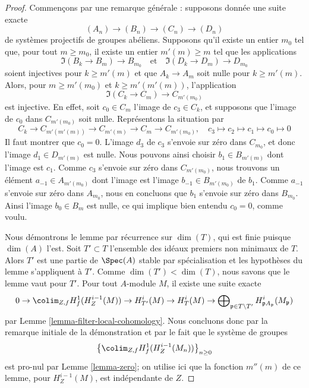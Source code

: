 \begin{proof}
Commençons par une remarque générale : supposons donnée une suite
exacte
$$
(A_n) \to (B_n) \to (C_n) \to (D_n)
$$
de systèmes projectifs de groupes abéliens. Supposons qu'il existe
un entier $m_0$ tel que, pour tout $m \geq m_0$,
il existe un entier $m'(m) \geq m$ tel que les applications
$$
\Im(B_k \to B_m) \longrightarrow B_{m_0}
\quad\text{et}\quad
\Im(D_k \to D_m) \longrightarrow D_{m_0}
$$
soient injectives pour $k \geq m'(m)$ et que $A_k \to A_m$ soit nulle
pour $k \geq m'(m)$. Alors, pour $m \geq m'(m_0)$ et $k \geq m'(m'(m))$,
l'application
$$
\Im(C_k \to C_m) \to C_{m'(m_0)}
$$
est injective. En effet, soit $c_0 \in C_m$ l'image de $c_3 \in C_k$,
et supposons que l'image de $c_0$ dans $C_{m'(m_0)}$ soit nulle. Représentons la situation par
$$
C_k \to C_{m'(m'(m))} \to C_{m'(m)} \to C_m \to C_{m'(m_0)},\quad
c_3 \mapsto c_2 \mapsto c_1 \mapsto c_0 \mapsto 0
$$
Il faut montrer que $c_0 = 0$.
L'image $d_3$ de $c_3$ s'envoie sur zéro dans $C_{m_0}$, et donc
l'image $d_1 \in D_{m'(m)}$ est nulle.
Nous pouvons ainsi choisir $b_1 \in B_{m'(m)}$ dont l'image est
$c_1$. Comme $c_3$ s'envoie sur zéro dans
$C_{m'(m_0)}$, nous trouvons un élément $a_{-1} \in A_{m'(m_0)}$
dont l'image est l'image $b_{-1} \in B_{m'(m_0)}$ de $b_1$.
Comme $a_{-1}$ s'envoie sur zéro dans $A_{m_0}$, nous en concluons que
$b_1$ s'envoie sur zéro dans $B_{m_0}$. Ainsi l'image $b_0 \in B_m$
est nulle, ce qui implique bien entendu $c_0 = 0$, comme voulu.

\medskip\noindent
Nous démontrons le lemme par récurrence sur $\dim(T)$, qui est
finie puisque $\dim(A)$ l'est. Soit $T' \subset T$
l'ensemble des idéaux premiers non minimaux de $T$. Alors $T'$ est une partie
de $\Spec(A)$ stable par spécialisation et les hypothèses
du lemme s'appliquent à $T'$. Comme $\dim(T') < \dim(T)$, nous savons
que le lemme vaut pour $T'$. Pour tout $A$-module $M$, il existe une
suite exacte
$$
0 \to \colim_{Z, f} H^1_f(H^{i - 1}_Z(M)) \to
H^i_{T'}(M) \to H^i_T(M) \to
\bigoplus\nolimits_{\mathfrak p \in T \setminus T'}
H^i_{\mathfrak p A_\mathfrak p}(M_\mathfrak p)
$$
par Lemme \ref{lemma-filter-local-cohomology}.
Nous concluons donc par la remarque initiale de la démonstration
et par le fait que le système de groupes
$$
\left\{\colim_{Z, f} H^1_f(H^{i - 1}_Z(M_n))\right\}_{n \geq 0}
$$
est pro-nul par Lemme \ref{lemma-zero}; on utilise ici que la fonction
$m''(m)$ de ce lemme, pour $H^{i - 1}_Z(M)$, est indépendante de $Z$.
\end{proof}










